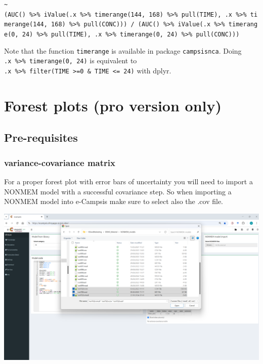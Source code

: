 \documentclass[
]{book}
\begin{document}
\texttt{\textasciitilde{}(AUC()\ \%\textgreater{}\%\ iValue(.x\ \%\textgreater{}\%\ timerange(144,\ 168)\ \%\textgreater{}\%\ pull(TIME),\ .x\ \%\textgreater{}\%\ timerange(144,\ 168)\ \%\textgreater{}\%\ pull(CONC)))\ /\ (AUC()\ \%\textgreater{}\%\ iValue(.x\ \%\textgreater{}\%\ timerange(0,\ 24)\ \%\textgreater{}\%\ pull(TIME),\ .x\ \%\textgreater{}\%\ timerange(0,\ 24)\ \%\textgreater{}\%\ pull(CONC)))}

Note that the function \texttt{timerange} is available in package \texttt{campsisnca}. Doing \texttt{.x\ \%\textgreater{}\%\ timerange(0,\ 24)} is equivalent to \texttt{.x\ \%\textgreater{}\%\ filter(TIME\ \textgreater{}=0\ \&\ TIME\ \textless{}=\ 24)} with dplyr.

\chapter{Forest plots (pro version only)}\label{forest-plots-pro-version-only}

\section{Pre-requisites}\label{pre-requisites}

\subsection{variance-covariance matrix}\label{variance-covariance-matrix}

For a proper forest plot with error bars of uncertainty you will need to import a NONMEM model with a successful covariance step. So when importing a NONMEM model into e-Campsis make sure to select also the .cov file.

\includegraphics{pictures/import_cov_file.png}
\end{document}
